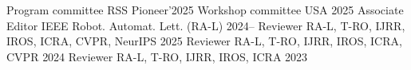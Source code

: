 

\begin{cvhonors}

  \cvhonor
    {Program committee} %
    {RSS Pioneer'2025 Workshop committee} %
    {USA} %
    {2025} %
  \cvhonor
    {Associate Editor} %
    {IEEE Robot. Automat. Lett. (RA-L)} %
    {} %
    {2024--} %
  \cvhonor
    {Reviewer} %
    {RA-L, T-RO, IJRR, IROS, ICRA, CVPR, NeurIPS} %
    {} %
    {2025} %
  \cvhonor
    {Reviewer} %
    {RA-L, T-RO, IJRR, IROS, ICRA, CVPR} %
    {} %
    {2024} %
  \cvhonor
    {Reviewer} %
    {RA-L, T-RO, IJRR, IROS, ICRA} %
    {} %
    {2023} %

\end{cvhonors}
